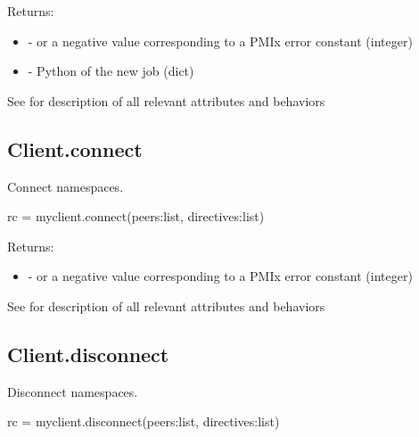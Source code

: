 Returns:

\begin{itemize}
    \item {} -  or a negative value corresponding to a PMIx error constant (integer)
    \item {} - Python  of the new job (dict)
\end{itemize}


See  for description of all relevant attributes and behaviors


\subsection{Client.connect}

\summary

Connect namespaces.

\format

\pyspecificstart
\begin{codepar}
rc = myclient.connect(peers:list, directives:list)
\end{codepar}
\pyspecificend

\begin{arglist}
\end{arglist}

Returns:

\begin{itemize}
    \item {} -  or a negative value corresponding to a PMIx error constant (integer)
\end{itemize}


See  for description of all relevant attributes and behaviors


\subsection{Client.disconnect}

\summary

Disconnect namespaces.

\format

\pyspecificstart
\begin{codepar}
rc = myclient.disconnect(peers:list, directives:list)
\end{codepar}
\pyspecificend

